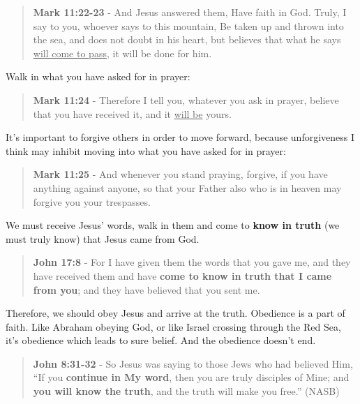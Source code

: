 \documentclass[11pt]{article}
\begin{document}
\begin{quote}
\textbf{Mark 11:22-23} - And Jesus answered them, Have faith in God. Truly, I say to you, whoever says to this mountain, Be taken up and thrown into the sea, and does not doubt in his heart, but believes that what he says \uline{will come to pass}, it will be done for him.
\end{quote}

Walk in what you have asked for in prayer:

\begin{quote}
\textbf{Mark 11:24} - Therefore I tell you, whatever you ask in prayer, believe that you have received it, and it \uline{will be} yours.
\end{quote}

It's important to forgive others in order to move forward, because unforgiveness I think may inhibit moving into what you have asked for in prayer:

\begin{quote}
\textbf{Mark 11:25} - And whenever you stand praying, forgive, if you have anything against anyone, so that your Father also who is in heaven may forgive you your trespasses.
\end{quote}

We must receive Jesus' words, walk in them and come to \textbf{know in truth} (we must truly know) that Jesus came from God.

\begin{quote}
\textbf{John 17:8} - For I have given them the words that you gave me, and they have received them and have \textbf{come to know in truth that I came from you}; and they have believed that you sent me.
\end{quote}

Therefore, we should obey Jesus and arrive at the truth. Obedience is a part of faith. Like Abraham obeying God, or like Israel crossing through the Red Sea, it's obedience which leads to sure belief.
And the obedience doesn't end.

\begin{quote}
\textbf{John 8:31-32} - So Jesus was saying to those Jews who had believed Him, “If you \textbf{continue in My word}, then you are truly disciples of Mine; and \textbf{you will know the truth}, and the truth will make you free.” (NASB)
\end{quote}
\end{document}
